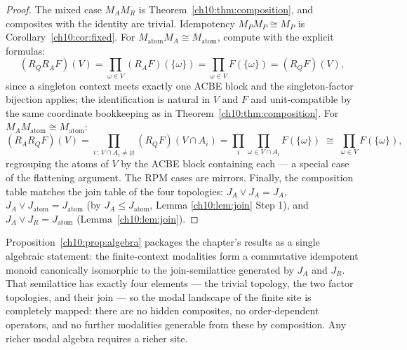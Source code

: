 \begin{proof}
The mixed case $M_A M_R$ is Theorem~\ref{ch10:thm:composition}, and
composites with the identity are trivial. Idempotency
$M_P M_P \cong M_P$ is Corollary~\ref{ch10:cor:fixed}. For
$M_{\mathrm{atom}} M_A \cong M_{\mathrm{atom}}$, compute with the
explicit formulas:
\[
(R_Q R_A F)(V) = \prod_{\omega \in V} (R_A F)(\{\omega\})
= \prod_{\omega \in V} F(\{\omega\}) = (R_Q F)(V),
\]
since a singleton context meets exactly one ACBE block and the
singleton-factor bijection applies; the identification is natural in
$V$ and $F$ and unit-compatible by the same coordinate bookkeeping as
in Theorem~\ref{ch10:thm:composition}. For
$M_A M_{\mathrm{atom}} \cong M_{\mathrm{atom}}$:
\[
(R_A R_Q F)(V) = \prod_{i \,:\, V \cap A_i \neq \varnothing}
(R_Q F)(V \cap A_i)
= \prod_{i} \prod_{\omega \in V \cap A_i} F(\{\omega\})
\;\cong\; \prod_{\omega \in V} F(\{\omega\}),
\]
regrouping the atoms of $V$ by the ACBE block containing each --- a
special case of the flattening argument. The RPM cases are mirrors.
Finally, the composition table matches the join table of the four
topologies: $J_A \vee J_A = J_A$, $J_A \vee J_{\mathrm{atom}} =
J_{\mathrm{atom}}$ (by $J_A \le J_{\mathrm{atom}}$, Lemma
\ref{ch10:lem:join} Step 1), and $J_A \vee J_R = J_{\mathrm{atom}}$
(Lemma~\ref{ch10:lem:join}).
\end{proof}

\begin{remark}
\label{ch10:rem:algebra}
Proposition~\ref{ch10:prop:algebra} packages the chapter's results as a
single algebraic statement: the finite-context modalities form a
commutative idempotent monoid canonically isomorphic to the
join-semilattice generated by $J_A$ and $J_R$. That semilattice has
exactly four elements --- the trivial topology, the two factor
topologies, and their join --- so the modal landscape of the finite
site is completely mapped: there are no hidden composites, no
order-dependent operators, and no further modalities generable from
these by composition. Any richer modal algebra requires a richer site.
\end{remark}

